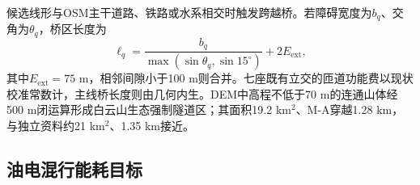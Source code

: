 \documentclass[preprint,12pt]{elsarticle}
\begin{document}
候选线形与OSM主干道路、铁路或水系相交时触发跨越桥。若障碍宽度为$b_q$、交角为$\theta_q$，桥区长度为
\begin{equation}
\ell_q=\frac{b_q}{\max(\sin\theta_q,\sin15^\circ)}+2E_{\mathrm{ext}},
\end{equation}
其中$E_{\mathrm{ext}}=75$ m，相邻间隙小于100 m则合并。七座既有立交的匝道功能费以现状校准常数计，主线桥长度则由几何内生。DEM中高程不低于70 m的连通山体经500 m闭运算形成白云山生态强制隧道区；其面积19.2 km$^2$、M-A穿越1.28 km，与独立资料约21 km$^2$、1.35 km接近。

\begin{table}[t]
\centering
\caption{案例当前模型主要参数。}
\end{table}

\subsection{油电混行能耗目标}
\end{document}
